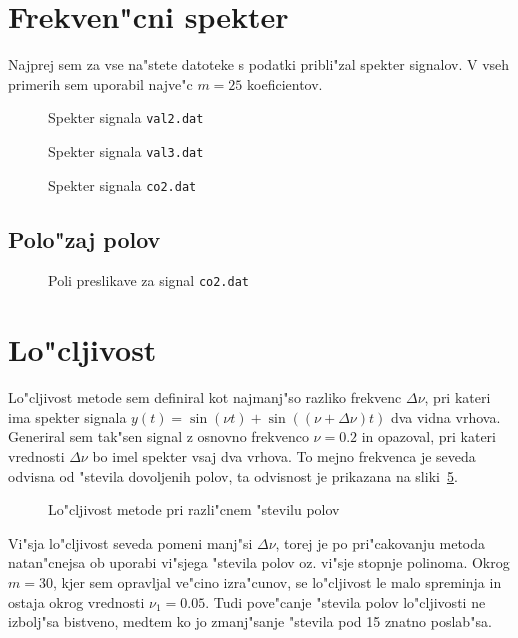 \documentclass[a4paper,10pt]{article}
\begin{document}
\section{Frekven"cni spekter}

Najprej sem za vse na"stete datoteke s podatki pribli"zal spekter signalov. V vseh primerih sem uporabil najve"c $m=25$ koeficientov. 

\begin{figure}[h]
 
 \caption{Spekter signala \texttt{val2.dat}}
 \label{fig:psd-val2}
\end{figure}

\begin{figure}[h]
 
 \caption{Spekter signala \texttt{val3.dat}}
 \label{fig:psd-val3}
\end{figure}

\begin{figure}[h]
 
 \caption{Spekter signala \texttt{co2.dat}}
 \label{fig:psd-co2}
\end{figure}


\subsection{Polo"zaj polov}

\begin{figure}[h]
 
 \caption{Poli preslikave za signal \texttt{co2.dat}}
 \label{fig:roots-co2}
\end{figure}


\section{Lo"cljivost}

Lo"cljivost metode sem definiral kot najmanj"so razliko frekvenc $\Delta\nu$, pri kateri ima spekter signala $y(t) = \sin(\nu t) + \sin((\nu + \Delta \nu)t)$ dva vidna vrhova. Generiral sem tak"sen signal z osnovno frekvenco $\nu = 0.2$ in opazoval, pri kateri vrednosti $\Delta\nu$ bo imel spekter vsaj dva vrhova. To mejno frekvenca je seveda odvisna od "stevila dovoljenih polov, ta odvisnost je prikazana na sliki~\ref{fig:loc}. 

\begin{figure}[h]
 
 \caption{Lo"cljivost metode pri razli"cnem "stevilu polov}
 \label{fig:loc}
\end{figure}

Vi"sja lo"cljivost seveda pomeni manj"si $\Delta \nu$, torej je po pri"cakovanju metoda natan"cnejsa ob uporabi vi"sjega "stevila polov oz. vi"sje stopnje polinoma. Okrog $m=30$, kjer sem opravljal ve"cino izra"cunov, se lo"cljivost le malo spreminja in ostaja okrog vrednosti $\nu_1 = 0.05$. Tudi pove"canje "stevila polov lo"cljivosti ne izbolj"sa bistveno, medtem ko jo zmanj"sanje "stevila pod 15 znatno poslab"sa. 
\end{document}

